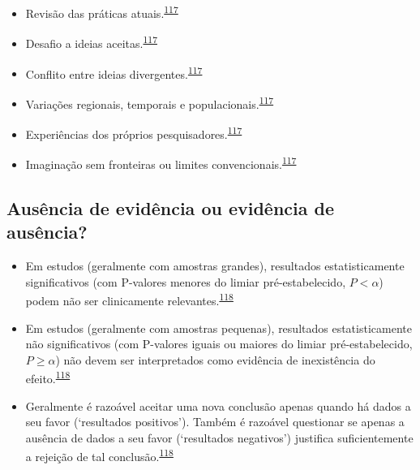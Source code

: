 \documentclass[
  a4paper,
]{book}
\begin{document}
\begin{itemize}
\item
  Revisão das práticas atuais.\textsuperscript{\protect\hyperlink{ref-Vandenbroucke2018}{117}}
\item
  Desafio a ideias aceitas.\textsuperscript{\protect\hyperlink{ref-Vandenbroucke2018}{117}}
\item
  Conflito entre ideias divergentes.\textsuperscript{\protect\hyperlink{ref-Vandenbroucke2018}{117}}
\item
  Variações regionais, temporais e populacionais.\textsuperscript{\protect\hyperlink{ref-Vandenbroucke2018}{117}}
\item
  Experiências dos próprios pesquisadores.\textsuperscript{\protect\hyperlink{ref-Vandenbroucke2018}{117}}
\item
  Imaginação sem fronteiras ou limites convencionais.\textsuperscript{\protect\hyperlink{ref-Vandenbroucke2018}{117}}
\end{itemize}

\hypertarget{ausuxeancia-de-eviduxeancia-ou-eviduxeancia-de-ausuxeancia}{%
\subsection{Ausência de evidência ou evidência de ausência?}\label{ausuxeancia-de-eviduxeancia-ou-eviduxeancia-de-ausuxeancia}}

\begin{itemize}
\item
  Em estudos (geralmente com amostras grandes), resultados estatisticamente significativos (com P-valores menores do limiar pré-estabelecido, \(P<\alpha\)) podem não ser clinicamente relevantes.\textsuperscript{\protect\hyperlink{ref-altman1995}{118}}
\item
  Em estudos (geralmente com amostras pequenas), resultados estatisticamente não significativos (com P-valores iguais ou maiores do limiar pré-estabelecido, \(P≥\alpha\)) não devem ser interpretados como evidência de inexistência do efeito.\textsuperscript{\protect\hyperlink{ref-altman1995}{118}}
\item
  Geralmente é razoável aceitar uma nova conclusão apenas quando há dados a seu favor (`resultados positivos'). Também é razoável questionar se apenas a ausência de dados a seu favor (`resultados negativos') justifica suficientemente a rejeição de tal conclusão.\textsuperscript{\protect\hyperlink{ref-altman1995}{118}}
\end{itemize}
\end{document}

